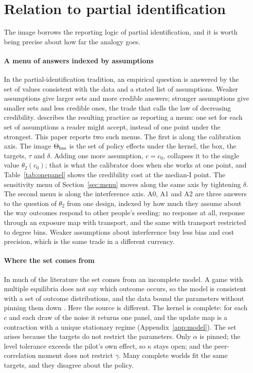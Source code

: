 \section{Relation to partial identification}\label{sec:pi}

The image borrows the reporting logic of partial identification, and it is worth
being precise about how far the analogy goes.

\paragraph{A menu of answers indexed by assumptions} In the partial-identification
tradition, an empirical question is answered by the set of values consistent with
the data and a stated list of assumptions. Weaker assumptions give larger sets and
more credible answers; stronger assumptions give smaller sets and less credible
ones, the trade that \citet{manski2003} calls the law of decreasing credibility.
\citet{tamer2010} describes the resulting practice as reporting a menu: one set
for each set of assumptions a reader might accept, instead of one point under the
strongest. This paper reports two such menus. The first is along the calibration
axis. The image $\Theta_{\mathrm{hm}}$ is the set of policy effects under the kernel, the
box, the targets, $\tau$ and $\delta$. Adding one more assumption, $c=c_0$,
collapses it to the single value $\theta_2(c_0)$; that is what the calibrator does
when she works at one point, and Table~\ref{tab:onepanel} shows the credibility
cost at the median-I point. The sensitivity menu of Section~\ref{sec:menu} moves
along the same axis by tightening $\delta$. The second menu is along the
interference axis. A0, A1 and A2 are three answers to the question of $\theta_2$
from one design, indexed by how much they assume about the way outcomes respond to
other people's seeding: no response at all, response through an exposure map with
transport, and the same with transport restricted to degree bins. Weaker
assumptions about interference buy less bias and cost precision, which is the same
trade in a different currency.

\paragraph{Where the set comes from} In much of the literature the set comes from
an incomplete model. A game with multiple equilibria does not say which outcome
occurs, so the model is consistent with a set of outcome distributions, and the
data bound the parameters without pinning them down \citep{tamer2003,tamer2010}.
Here the source is different. The kernel is complete: for each $c$ and each draw
of the noise it returns one panel, and the update map is a contraction with a
unique stationary regime (Appendix~\ref{app:model}). The set arises because the
targets do not restrict the parameters. Only $\alpha$ is pinned; the level
tolerance exceeds the pilot's own effect, so $\kappa$ stays open; and the
peer-correlation moment does not restrict $\gamma$. Many complete worlds fit the
same targets, and they disagree about the policy.


